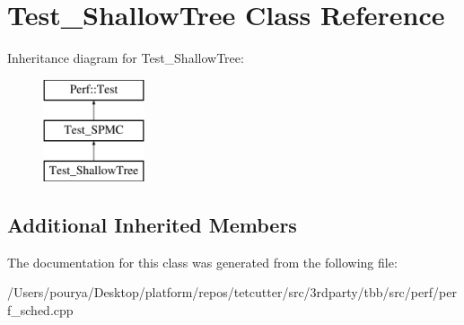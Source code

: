 \hypertarget{classTest__ShallowTree}{}\section{Test\+\_\+\+Shallow\+Tree Class Reference}
\label{classTest__ShallowTree}
Inheritance diagram for Test\+\_\+\+Shallow\+Tree\+:\begin{figure}[H]
\begin{center}
\leavevmode
\includegraphics[height=3.000000cm]{classTest__ShallowTree}
\end{center}
\end{figure}
\subsection*{Additional Inherited Members}


The documentation for this class was generated from the following file\+:\begin{DoxyCompactItemize}
\item 
/\+Users/pourya/\+Desktop/platform/repos/tetcutter/src/3rdparty/tbb/src/perf/perf\+\_\+sched.\+cpp\end{DoxyCompactItemize}
